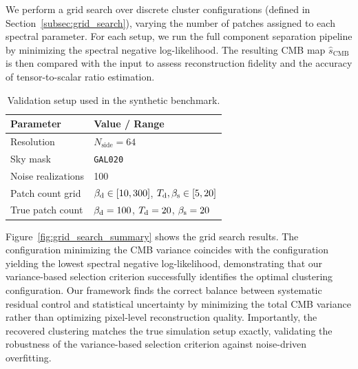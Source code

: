 \documentclass[fleqn,usenatbib]{mnras}
\begin{document}
We perform a grid search over discrete cluster configurations (defined in Section~\ref{subsec:grid_search}), varying the number of patches assigned to each spectral parameter. For each setup, we run the full component separation pipeline by minimizing the spectral negative log-likelihood. The resulting CMB map \( \hat{s}_{\mathrm{CMB}} \) is then compared with the input to assess reconstruction fidelity and the accuracy of tensor-to-scalar ratio estimation.

\begin{table}
    \centering
    \small
    \caption{Validation setup used in the synthetic benchmark.}
    \label{tab:validation_config}
    \begin{tabular}{@{}p{3.5cm}|p{5cm}@{}}
        \toprule
        \textbf{Parameter} & \textbf{Value / Range} \\
        \midrule
        Resolution & \( N_{\text{side}} = 64 \) \\
        Sky mask & \texttt{GAL020}~\citep{Planck2020Legacy}\\
        Noise realizations & 100 \\
        Patch count grid & \( \beta_{\rm d} \in [10, 300] \), \( T_{\rm d}, \beta_{\rm s} \in [5, 20] \) \\
        True patch count & \( \beta_{\rm d} = 100 \), \( T_{\rm d} = 20 \), \( \beta_{\rm s} = 20 \) \\
        \bottomrule
    \end{tabular}
\end{table}


Figure~\ref{fig:grid_search_summary} shows the grid search results. The configuration minimizing the CMB variance coincides with the configuration yielding the lowest spectral negative log-likelihood, demonstrating that our variance-based selection criterion successfully identifies the optimal clustering configuration. Our framework finds the correct balance between systematic residual control and statistical uncertainty by minimizing the total CMB variance rather than optimizing pixel-level reconstruction quality. Importantly, the recovered clustering matches the true simulation setup exactly, validating the robustness of the variance-based selection criterion against noise-driven overfitting.
\end{document}
